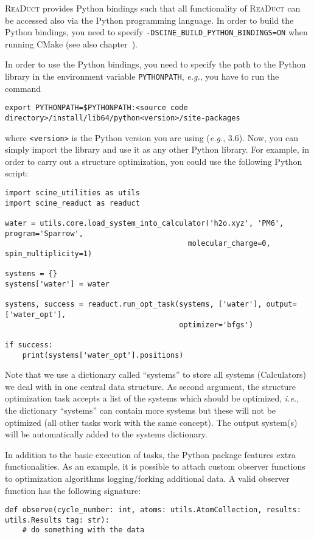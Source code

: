 \documentclass[]{tufte-book}
\begin{document}
\textsc{ReaDuct} provides Python bindings such that all functionality of \textsc{ReaDuct} can be accessed also via the
Python programming language. In order to build the Python bindings, you need to specify \texttt{-DSCINE\_BUILD\_PYTHON\_BINDINGS=ON}
when running CMake (see also chapter~).

In order to use the Python bindings, you need to specify the path to the Python library in the environment variable
\texttt{PYTHONPATH}, \textit{e.g.}, you have to run the command
\begin{verbatim}
export PYTHONPATH=$PYTHONPATH:<source code directory>/install/lib64/python<version>/site-packages
\end{verbatim}
where \texttt{<version>} is the Python version you are using (\textit{e.g.}, 3.6). Now, you can simply import the library
and use it as any other Python library. For example, in order to carry out a structure optimization, you could use the
following Python script:
\begin{verbatim}
import scine_utilities as utils
import scine_readuct as readuct

water = utils.core.load_system_into_calculator('h2o.xyz', 'PM6', program='Sparrow',
                                          molecular_charge=0, spin_multiplicity=1)

systems = {}
systems['water'] = water

systems, success = readuct.run_opt_task(systems, ['water'], output=['water_opt'],
                                        optimizer='bfgs')

if success:
    print(systems['water_opt'].positions)
\end{verbatim}
Note that we use a dictionary called ``systems'' to store all systems (Calculators) we deal with in one central data
structure. As second argument, the structure optimization task accepts a list of the systems which should be optimized,
\textit{i.e.}, the dictionary ``systems'' can contain more systems but these will not be optimized (all other tasks
work with the same concept). The output system(s) will be automatically added to the systems dictionary.

In addition to the basic execution of tasks, the Python package features extra functionalities.
As an example, it is possible to attach custom observer functions to optimization algorithms logging/forking additional
data.
A valid observer function has the following signature:

\begin{verbatim}
def observe(cycle_number: int, atoms: utils.AtomCollection, results: utils.Results tag: str):
    # do something with the data
\end{verbatim}
\end{document}
